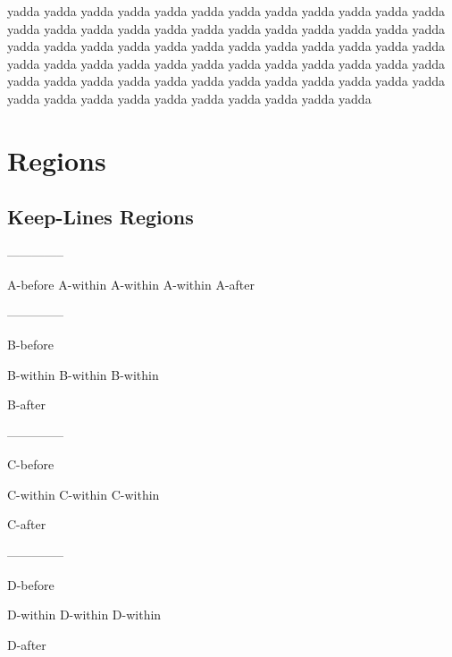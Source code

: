 yadda yadda yadda yadda yadda yadda yadda yadda yadda yadda
yadda yadda yadda yadda yadda yadda yadda yadda yadda yadda
yadda yadda yadda yadda yadda yadda yadda yadda yadda yadda
yadda yadda yadda yadda yadda yadda yadda yadda yadda yadda
yadda yadda yadda yadda yadda yadda yadda yadda yadda yadda
yadda yadda yadda yadda yadda yadda yadda yadda yadda yadda
yadda yadda yadda yadda yadda yadda yadda yadda yadda yadda\par
\chapter{Regions
}

\section{Keep-Lines Regions
}

--------------


A-before
\begingroup\obeyalllines{}A-within
A-within
A-within
\endgroup{}A-after\par
--------------


B-before\par

\begingroup\obeyalllines{}B-within
B-within
B-within
\endgroup{}\par

B-after\par
--------------


C-before
\begingroup\obeyalllines{}\par

C-within
C-within
C-within\par

\endgroup{}C-after\par
--------------


D-before\par

\begingroup\obeyalllines{}\par

D-within
D-within
D-within\par

\endgroup{}\par

D-after\par